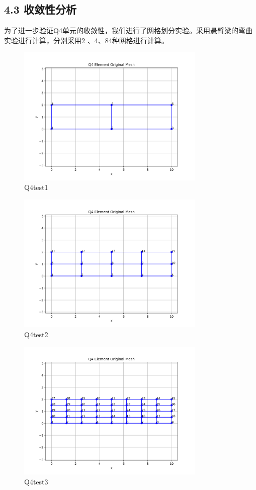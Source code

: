 \documentclass[12pt]{article}
\begin{document}
\subsection*{4.3 收敛性分析}
为了进一步验证Q4单元的收敛性，我们进行了网格划分实验。采用悬臂梁的弯曲实验进行计算，分别采用2 、4、8\times 4种网格进行计算。\\
\begin{figure}[htbp]
    \centering
    \includegraphics[width=0.8\textwidth]{data/test1_original.png}
    \caption{Q4test1}
\end{figure}
\begin{figure}[htbp]
    \centering
    \includegraphics[width=0.8\textwidth]{data/test2_original.png}
    \caption{Q4test2}
\end{figure}
\begin{figure}[htbp]
    \centering
    \includegraphics[width=0.8\textwidth]{data/test3_original.png}
    \caption{Q4test3}
\end{figure}
\end{document}
